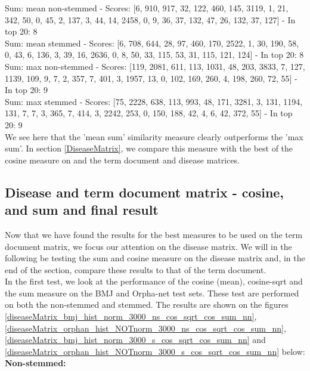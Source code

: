 {\small
Sum: mean non-stemmed - Scores: [6, 910, 917, 32, 122, 460, 145, 3119, 1, 21, 342, 50, 0, 45, 2, 137, 3, 44, 14, 2458, 0, 9, 36, 37, 132, 47, 26, 132, 37, 127] - In top 20: 8 \\
Sum: mean stemmed - Scores: [6, 708, 644, 28, 97, 460, 170, 2522, 1, 30, 190, 58, 0, 43, 6, 136, 3, 39, 16, 2636, 0, 8, 50, 33, 115, 53, 31, 115, 121, 124] - In top 20: 8 \\
Sum: max non-stemmed - Scores: [119, 2081, 611, 113, 1031, 48, 203, 3833, 7, 127, 1139, 109, 9, 7, 2, 357, 7, 401, 3, 1957, 13, 0, 102, 169, 260, 4, 198, 260, 72, 55] - In top 20: 9 \\
Sum: max stemmed - Scores: [75, 2228, 638, 113, 993, 48, 171, 3281, 3, 131, 1194, 131, 7, 7, 3, 365, 7, 414, 3, 2242, 253, 0, 150, 188, 42, 4, 6, 42, 372, 55] - In top 20: 9 \\
}
We see here that the 'mean sum' similarity measure clearly outperforms the 'max sum'. In section \ref{DiseaseMatrix}, we compare this measure with the best of the cosine measure on and the term document and disease matrices.

\subsection{Disease and term document matrix - cosine, and sum and final result}

Now that we have found the results for the best measures to be used on
the term document matrix, we focus our attention on the disease
matrix. We will in the following be testing the sum and cosine measure
on the disease matrix and, in the end of the section, compare these
results to that of the term document. \\

In the first test, we look at the performance of the cosine (mean),
cosine-sqrt and the sum measure on the BMJ and Orpha-net test
sets. These test are performed on both the non-stemmed and
stemmed. The results are shown on the figures
\ref{diseaseMatrix_bmj_hist_norm_3000_ns_cos_sqrt_cos_sum_nn},
\ref{diseaseMatrix_orphan_hist_NOTnorm_3000_ns_cos_sqrt_cos_sum_nn},
\ref{diseaseMatrix_bmj_hist_norm_3000_s_cos_sqrt_cos_sum_nn} and
\ref{diseaseMatrix_orphan_hist_NOTnorm_3000_s_cos_sqrt_cos_sum_nn}
below: \\

\textbf{Non-stemmed:}

